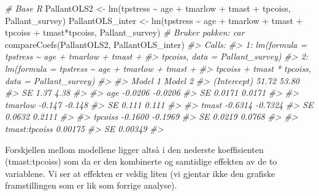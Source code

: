 \documentclass[
]{article}
\newenvironment{Shaded}{\begin{snugshade}}{\end{snugshade}}
\newcommand{\CommentTok}[1]{\textcolor[rgb]{0.56,0.35,0.01}{\textit{#1}}}
\newcommand{\FunctionTok}[1]{\textcolor[rgb]{0.00,0.00,0.00}{#1}}
\newcommand{\NormalTok}[1]{#1}
\newcommand{\OtherTok}[1]{\textcolor[rgb]{0.56,0.35,0.01}{#1}}
\newcommand{\SpecialCharTok}[1]{\textcolor[rgb]{0.00,0.00,0.00}{#1}}
\begin{document}
\begin{Shaded}
\begin{Highlighting}[]
\CommentTok{\# Base R}
\NormalTok{PallantOLS2 }\OtherTok{\textless{}{-}} \FunctionTok{lm}\NormalTok{(tpstress }\SpecialCharTok{\textasciitilde{}}\NormalTok{ age }\SpecialCharTok{+}\NormalTok{ tmarlow }\SpecialCharTok{+}\NormalTok{ tmast }\SpecialCharTok{+}\NormalTok{ tpcoiss, Pallant\_survey)}
\NormalTok{PallantOLS\_inter }\OtherTok{\textless{}{-}} \FunctionTok{lm}\NormalTok{(tpstress }\SpecialCharTok{\textasciitilde{}}\NormalTok{ age }\SpecialCharTok{+}\NormalTok{ tmarlow }\SpecialCharTok{+}\NormalTok{ tmast }\SpecialCharTok{+}\NormalTok{ tpcoiss }\SpecialCharTok{+}\NormalTok{ tmast}\SpecialCharTok{*}\NormalTok{tpcoiss, Pallant\_survey)}
\CommentTok{\# Bruker pakken: car}
\FunctionTok{compareCoefs}\NormalTok{(PallantOLS2, PallantOLS\_inter)}
\CommentTok{\#\textgreater{} Calls:}
\CommentTok{\#\textgreater{} 1: lm(formula = tpstress \textasciitilde{} age + tmarlow + tmast + }
\CommentTok{\#\textgreater{}   tpcoiss, data = Pallant\_survey)}
\CommentTok{\#\textgreater{} 2: lm(formula = tpstress \textasciitilde{} age + tmarlow + tmast + }
\CommentTok{\#\textgreater{}   tpcoiss + tmast * tpcoiss, data = Pallant\_survey)}
\CommentTok{\#\textgreater{} }
\CommentTok{\#\textgreater{}               Model 1 Model 2}
\CommentTok{\#\textgreater{} (Intercept)     51.72   53.80}
\CommentTok{\#\textgreater{} SE               1.37    4.38}
\CommentTok{\#\textgreater{}                              }
\CommentTok{\#\textgreater{} age           {-}0.0206 {-}0.0206}
\CommentTok{\#\textgreater{} SE             0.0171  0.0171}
\CommentTok{\#\textgreater{}                              }
\CommentTok{\#\textgreater{} tmarlow        {-}0.147  {-}0.148}
\CommentTok{\#\textgreater{} SE              0.111   0.111}
\CommentTok{\#\textgreater{}                              }
\CommentTok{\#\textgreater{} tmast         {-}0.6314 {-}0.7324}
\CommentTok{\#\textgreater{} SE             0.0632  0.2111}
\CommentTok{\#\textgreater{}                              }
\CommentTok{\#\textgreater{} tpcoiss       {-}0.1600 {-}0.1969}
\CommentTok{\#\textgreater{} SE             0.0219  0.0768}
\CommentTok{\#\textgreater{}                              }
\CommentTok{\#\textgreater{} tmast:tpcoiss         0.00175}
\CommentTok{\#\textgreater{} SE                    0.00349}
\CommentTok{\#\textgreater{} }
\end{Highlighting}
\end{Shaded}

Forskjellen mellom modellene ligger altså i den nederste koeffisienten (tmast:tpcoiss) som da er den kombinerte og samtidige effekten av de to variablene. Vi ser at effekten er veldig liten (vi gjentar ikke den grafiske framstillingen som er lik som forrige analyse).
\end{document}

